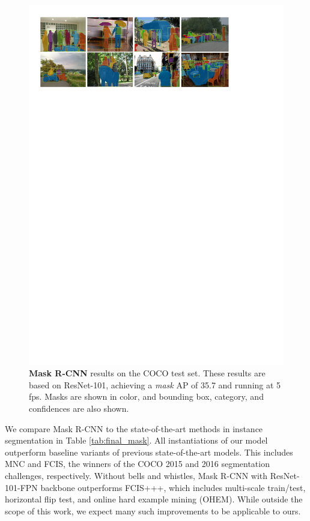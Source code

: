 \begin{figure}[t]
\centering
\includegraphics[width=1\linewidth]{figures/mask_rcnn/results_main}
\caption{\textbf{Mask R-CNN} results on the COCO test set. These results are based on ResNet-101, achieving a \emph{mask} AP of 35.7 and running at 5 fps. Masks are shown in color, and bounding box, category, and confidences are also shown.}
\label{fig:results_main}\vspace{-2mm}
\end{figure}

We compare Mask R-CNN to the state-of-the-art methods in instance segmentation in Table \ref{tab:final_mask}. All instantiations of our model outperform baseline variants of previous state-of-the-art models. This includes MNC and FCIS, the winners of the COCO 2015 and 2016 segmentation challenges, respectively. Without bells and whistles, Mask R-CNN with ResNet-101-FPN backbone outperforms FCIS+++, which includes multi-scale train/test, horizontal flip test, and online hard example mining (OHEM). While outside the scope of this work, we expect many such improvements to be applicable to ours.

